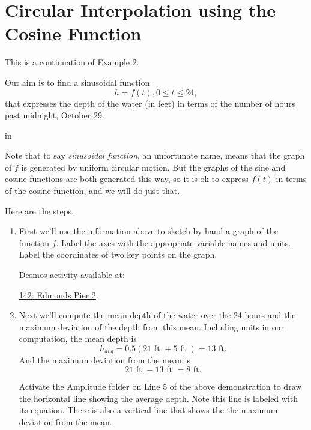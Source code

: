 \documentclass{ximera}
\newcommand{\pskip}{\vskip 0.1 in}
\begin{document}
\section{Circular Interpolation using the Cosine Function}

\begin{example} \label{EODGrgrgrFDSFSD}


This is a continuation of Example 2.

Our aim is to find a sinusoidal function
\[
    h = f(t) , 0\leq t \leq 24, 
\]
that expresses the depth of the water (in feet) in terms of the number of hours past midnight, October 29. 

\pskip

Note that to say \emph{sinusoidal function}, an unfortunate name, means that the graph of $f$ is generated by uniform circular motion. But the graphs of the sine and cosine functions are both generated this way, so it is ok to express $f(t)$ in terms of the cosine function, and we will do just that.

\begin{explanation}
Here are the steps.

\begin{enumerate}

\item  First we'll use the information above to sketch by hand a graph of the function $f$. Label the axes with the appropriate variable names and units. Label the coordinates of two key points on the graph.

Desmos activity available at:

\href{https://www.desmos.com/calculator/cxybepr3od}{142: Edmonds Pier 2}.

 
\begin{onlineOnly}
    \begin{center}
\end{center}
\end{onlineOnly}



\item Next we'll compute the mean depth of the water over the 24 hours and the maximum deviation of the depth from this mean. Including units in our computation, the mean depth is 
\[
    h_{avg} = 0.5 ( 21 \text{ ft } + 5 \text{ ft }) = 13 \text{ ft} . 
\]
And the maximum deviation from the mean is
\[
     21 \text{ ft } - 13 \text{ ft } = 8 \text{ ft}.
\]

Activate the Amplitude folder on Line 5 of the above demonstration to draw the horizontal line showing the average depth. Note this line is labeled with its equation. There is also a vertical line that shows the the maximum deviation from the mean.


\end{enumerate}
\end{explanation}
\end{example}
\end{document}
